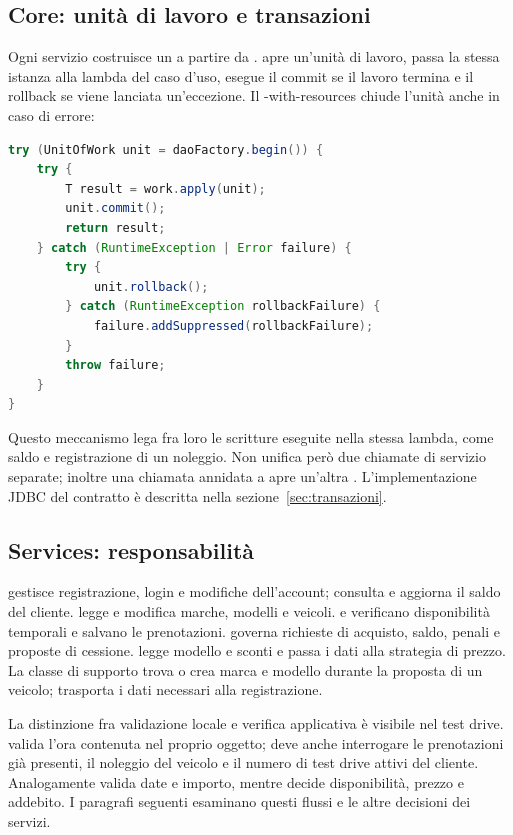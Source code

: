 \subsection{Core: unità di lavoro e transazioni}
Ogni servizio costruisce un  a partire da .  apre un'unità di lavoro, passa la stessa istanza alla lambda del caso d'uso, esegue il commit se il lavoro termina e il rollback se viene lanciata un'eccezione. Il -with-resources chiude l'unità anche in caso di errore:
\par\medskip\noindent\begin{minipage}{\linewidth}
\begin{lstlisting}[language=Java,caption={Nucleo di TransactionRunner.execute, dal sorgente corrente.},label={lst:transaction-runner}]
try (UnitOfWork unit = daoFactory.begin()) {
    try {
        T result = work.apply(unit);
        unit.commit();
        return result;
    } catch (RuntimeException | Error failure) {
        try {
            unit.rollback();
        } catch (RuntimeException rollbackFailure) {
            failure.addSuppressed(rollbackFailure);
        }
        throw failure;
    }
}
\end{lstlisting}
\end{minipage}\par\medskip
Questo meccanismo lega fra loro le scritture eseguite nella stessa lambda, come saldo e registrazione di un noleggio. Non unifica però due chiamate di servizio separate; inoltre una chiamata annidata a  apre un'altra . L'implementazione JDBC del contratto è descritta nella sezione~\ref{sec:transazioni}.

\subsection{Services: responsabilità}
 gestisce registrazione, login e modifiche dell'account;  consulta e aggiorna il saldo del cliente.  legge e modifica marche, modelli e veicoli.  e  verificano disponibilità temporali e salvano le prenotazioni.  governa richieste di acquisto, saldo, penali e proposte di cessione.  legge modello e sconti e passa i dati alla strategia di prezzo. La classe di supporto  trova o crea marca e modello durante la proposta di un veicolo;  trasporta i dati necessari alla registrazione.

La distinzione fra validazione locale e verifica applicativa è visibile nel test drive.  valida l'ora contenuta nel proprio oggetto;  deve anche interrogare le prenotazioni già presenti, il noleggio del veicolo e il numero di test drive attivi del cliente. Analogamente  valida date e importo, mentre  decide disponibilità, prezzo e addebito. I paragrafi seguenti esaminano questi flussi e le altre decisioni dei servizi.
